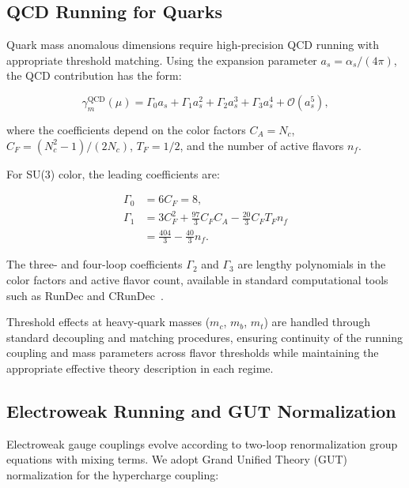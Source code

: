 \documentclass[%
amsmath,amssymb,
aps,
prb,
floatfix,
twocolumn
]{revtex4-2}
\begin{document}
\subsection{QCD Running for Quarks}
\label{subsec:qcd_running}

Quark mass anomalous dimensions require high-precision QCD running with appropriate threshold matching. Using the expansion parameter $a_s = \alpha_s/(4\pi)$, the QCD contribution has the form:

\begin{equation}
\gamma_m^{\text{QCD}}(\mu) = \Gamma_0 a_s + \Gamma_1 a_s^2 + \Gamma_2 a_s^3 + \Gamma_3 a_s^4 + \mathcal{O}(a_s^5),
\label{eq:qcd_gamma_expansion}
\end{equation}

where the coefficients depend on the color factors $C_A = N_c$, $C_F = (N_c^2-1)/(2N_c)$, $T_F = 1/2$, and the number of active flavors $n_f$.

For SU(3) color, the leading coefficients are:

\begin{align}
\Gamma_0 &= 6C_F = 8, \label{eq:Gamma0} \\
\Gamma_1 &= 3C_F^2 + \frac{97}{3}C_F C_A - \frac{20}{3}C_F T_F n_f \label{eq:Gamma1} \\
&= \frac{404}{3} - \frac{40}{3}n_f.
\end{align}

The three- and four-loop coefficients $\Gamma_2$ and $\Gamma_3$ are lengthy polynomials in the color factors and active flavor count, available in standard computational tools such as RunDec and CRunDec~\cite{ChetyrkinKuehnSteinhauser2000,HerrenSteinhauser2018}.

Threshold effects at heavy-quark masses ($m_c$, $m_b$, $m_t$) are handled through standard decoupling and matching procedures, ensuring continuity of the running coupling and mass parameters across flavor thresholds while maintaining the appropriate effective theory description in each regime.

\subsection{Electroweak Running and GUT Normalization}
\label{subsec:ew_running}

Electroweak gauge couplings evolve according to two-loop renormalization group equations with mixing terms. We adopt Grand Unified Theory (GUT) normalization for the hypercharge coupling:
\end{document}
